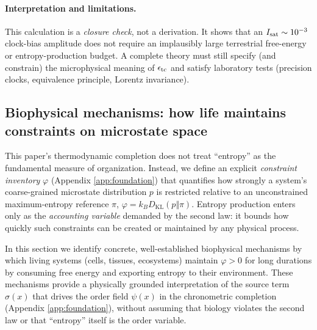 \documentclass[10pt]{article}
\begin{document}
\paragraph{Interpretation and limitations.}
This calculation is a \emph{closure check}, not a derivation. It shows that an \(I_{\rm sat}\sim 10^{-3}\)
clock-bias amplitude does not require an implausibly large terrestrial free-energy or entropy-production
budget. A complete theory must still specify (and constrain) the microphysical meaning of
\(\epsilon_{\rm tc}\) and satisfy laboratory tests (precision clocks, equivalence principle, Lorentz invariance).

\subsection{Biophysical mechanisms: how life maintains constraints on microstate space}
\label{sec:life_constraints}

This paper’s thermodynamic completion does not treat ``entropy'' as the fundamental measure of
organization. Instead, we define an explicit \emph{constraint inventory} \(\varphi\) (Appendix
\ref{app:foundation}) that quantifies how strongly a system’s coarse-grained microstate
distribution \(p\) is restricted relative to an unconstrained maximum-entropy reference \(\pi\),
\(\varphi = k_B D_{\mathrm{KL}}(p\Vert\pi)\).
Entropy production enters only as the \emph{accounting variable} demanded by the second law: it
bounds how quickly such constraints can be created or maintained by any physical process.

In this section we identify concrete, well-established biophysical mechanisms by which living
systems (cells, tissues, ecosystems) maintain \(\varphi>0\) for long durations by consuming free
energy and exporting entropy to their environment. These mechanisms provide a physically grounded
interpretation of the source term \(\sigma(x)\) that drives the order field \(\psi(x)\) in the
chronometric completion (Appendix \ref{app:foundation}), without assuming that biology violates the
second law or that ``entropy'' itself is the order variable. \cite{Seifert2012ST,Parrondo2015ThermoInfo}
\end{document}
